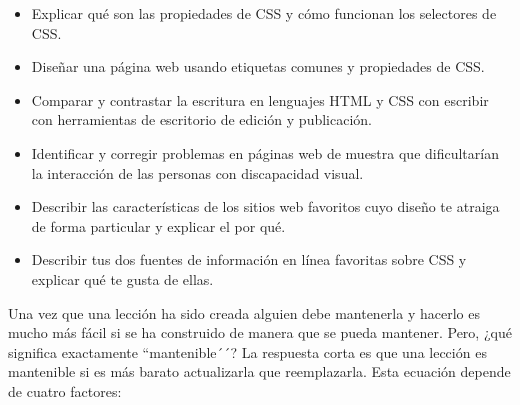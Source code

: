 \begin{itemize}
 
\item
  Explicar qué son las propiedades de CSS y cómo funcionan los selectores de CSS.
 
\item
  Diseñar una página web usando etiquetas comunes y propiedades de CSS.
 
\item
 Comparar y contrastar la escritura en lenguajes HTML y CSS
con escribir con herramientas de escritorio de edición y publicación.
 
\item
  Identificar y corregir problemas en páginas web de muestra
  que dificultarían la interacción de las personas con discapacidad visual.
 
\item
Describir las características de los sitios web favoritos
cuyo diseño te atraiga de forma particular
y explicar el por qué.
 
\item
  Describir tus dos fuentes de información en línea favoritas sobre
CSS y explicar qué te gusta de ellas.
 
\end{itemize}
 
 
Una vez que una lección ha sido creada alguien debe mantenerla
y hacerlo es mucho más fácil si se ha construido de manera que se pueda mantener.
Pero, ¿qué significa exactamente ``mantenible´´? 
La respuesta corta es que una lección es mantenible
si es más barato actualizarla que reemplazarla.
Esta ecuación depende de cuatro factores:
 
